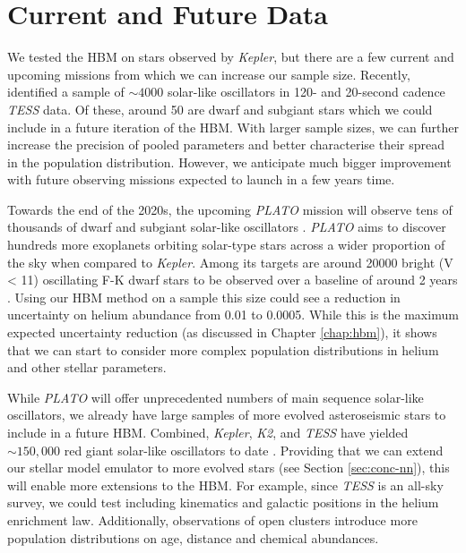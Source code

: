 
\section{Current and Future Data}\label{sec:conc-future}

We tested the HBM on stars observed by \emph{Kepler}, but there are a few current and upcoming missions from which we can increase our sample size. Recently, \citet{Hatt.Nielsen.ea2023} identified a sample of \(\sim 4000\) solar-like oscillators in 120- and 20-second cadence \emph{TESS} data. Of these, around 50  are dwarf and subgiant stars which we could include in a future iteration of the HBM. With larger sample sizes, we can further increase the precision of pooled parameters and better characterise their spread in the population distribution. However, we anticipate much bigger improvement with future observing missions expected to launch in a few years time.


Towards the end of the 2020s, the upcoming \emph{PLATO} mission will observe tens of thousands of dwarf and subgiant solar-like oscillators \citep{Rauer.Catala.ea2014}. \emph{PLATO} aims to discover hundreds more exoplanets orbiting solar-type stars across a wider proportion of the sky when compared to \emph{Kepler}. Among its targets are around \num{20000} bright (V < 11) oscillating F-K dwarf stars to be observed over a baseline of around 2 years \citep{Goupil2017}. Using our HBM method on a sample this size could see a reduction in uncertainty on helium abundance from 0.01 to 0.0005. While this is the maximum expected uncertainty reduction (as discussed in Chapter \ref{chap:hbm}), it shows that we can start to consider more complex population distributions in helium and other stellar parameters.

While \emph{PLATO} will offer unprecedented numbers of main sequence solar-like oscillators, we already have large samples of more evolved asteroseismic stars to include in a future HBM. Combined, \emph{Kepler}, \emph{K2}, and \emph{TESS} have yielded \(\sim 150,000\) red giant solar-like oscillators to date \citep{Hon.Huber.ea2021,Yu.Huber.ea2018}. Providing that we can extend our stellar model emulator to more evolved stars (see Section \ref{sec:conc-nn}), this will enable more extensions to the HBM. For example, since \emph{TESS} is an all-sky survey, we could test including kinematics and galactic positions in the helium enrichment law. Additionally, observations of open clusters introduce more population distributions on age, distance and chemical abundances.

